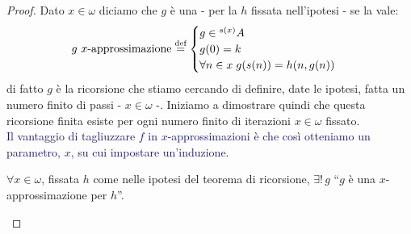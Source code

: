 \begin{proof}
	Dato $x \in \omega$ diciamo che $g$ è una  - per la $h$ fissata nell'ipotesi - se la vale:
	\[ \text{$g$ $x$-approssimazione} \overset{\text{def}}{=} \begin{cases}
		g \in {}^{s(x)}A \\
		g(0) = k \\
		\forall n \in x\; g(s(n)) = h(n,g(n))
	\end{cases}
		\]
	di fatto $g$ è la ricorsione che stiamo cercando di definire, date le ipotesi, fatta un numero finito di passi - $x \in \omega$ -.
	Iniziamo a dimostrare quindi che questa ricorsione finita esiste per ogni numero finito di iterazioni $x \in \omega$ fissato.\\
	\textcolor{MidnightBlue}{Il vantaggio di tagliuzzare $f$ in $x$-approssimazioni è che così otteniamo un parametro, $x$, su cui impostare un'induzione.}	
	\begin{lemma}
		$\forall x \in \omega$, fissata $h$ come nelle ipotesi del teorema di ricorsione, $\exists ! \, g$ ``$g$ è una $x$-approssimazione per $h$''.
	\end{lemma}


\end{proof}
